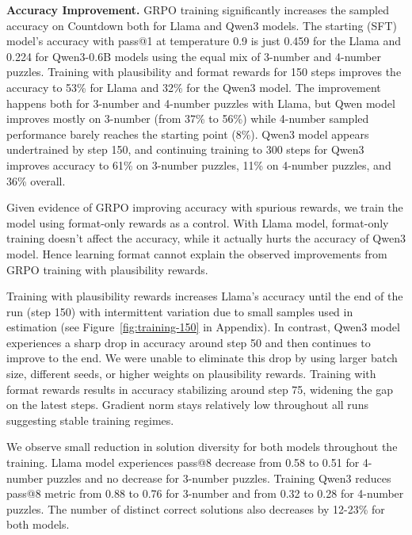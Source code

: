 \documentclass[12pt,a4paper]{article}
\begin{document}
\label{sec:corrupt}
\textbf{Accuracy Improvement.}  GRPO training significantly increases the sampled accuracy on Countdown both for Llama and Qwen3 models. The starting (SFT) model's accuracy with pass@1 at temperature 0.9 is just 0.459 for the Llama and 0.224 for Qwen3-0.6B models using the equal mix of 3-number and 4-number puzzles. Training with plausibility and format rewards for 150 steps improves the accuracy to 53\% for Llama and 32\% for the Qwen3 model. The improvement happens both for 3-number and 4-number puzzles with Llama, but Qwen model improves mostly on 3-number (from 37\% to 56\%) while 4-number sampled performance barely reaches the starting point (8\%). Qwen3 model appears undertrained by step 150, and continuing training to 300 steps for Qwen3 improves accuracy to 61\% on 3-number puzzles, 11\% on 4-number puzzles, and 36\% overall.

Given evidence of GRPO improving accuracy with spurious rewards, we train the model using format-only rewards as a control. With Llama model, format-only training doesn't affect the accuracy, while it actually hurts the accuracy of Qwen3 model. Hence learning format cannot explain the observed improvements from GRPO training with plausibility rewards.

Training with plausibility rewards increases Llama's accuracy until the end of the run (step 150) with intermittent variation due to small samples used in estimation (see  Figure~\ref{fig:training-150} in Appendix). In contrast, Qwen3 model experiences a sharp drop in accuracy around step 50 and then continues to improve to the end. We were unable to eliminate this drop by using larger batch size, different seeds, or higher weights on plausibility rewards.  Training with format rewards results in accuracy stabilizing around step 75, widening the gap on the latest steps. Gradient norm stays relatively low throughout all runs suggesting stable training regimes.

We observe small reduction in solution diversity for both models throughout the training. Llama model experiences pass@8 decrease from 0.58 to 0.51 for 4-number puzzles and no decrease for 3-number puzzles. Training Qwen3 reduces pass@8 metric from 0.88 to 0.76 for 3-number and from 0.32 to 0.28 for 4-number puzzles. The number of distinct correct solutions also decreases by 12-23\% for both models.



\end{document}
